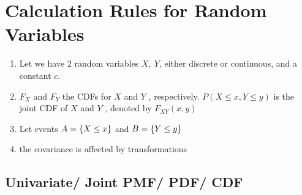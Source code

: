 \section{Calculation Rules for Random Variables}

\begin{enumerate}
    \item Let we have 2 random variables $X, \ Y$, either discrete or continuous, and a constant $c$.

    \item $F _X$ and $F_Y$ the CDFs for $X$ and $Y$ , respectively. $P(X \leq x, Y \leq y)$ is the joint CDF of $X$ and $Y$ , denoted by $F _{X Y} (x, y)$

    \item Let events $A = \left\{X \leq x\right\}$ and $B = \left\{Y \leq y\right\}$

    \item the covariance is affected by transformations
\end{enumerate}


\subsection{Univariate/ Joint PMF/ PDF/ CDF}


